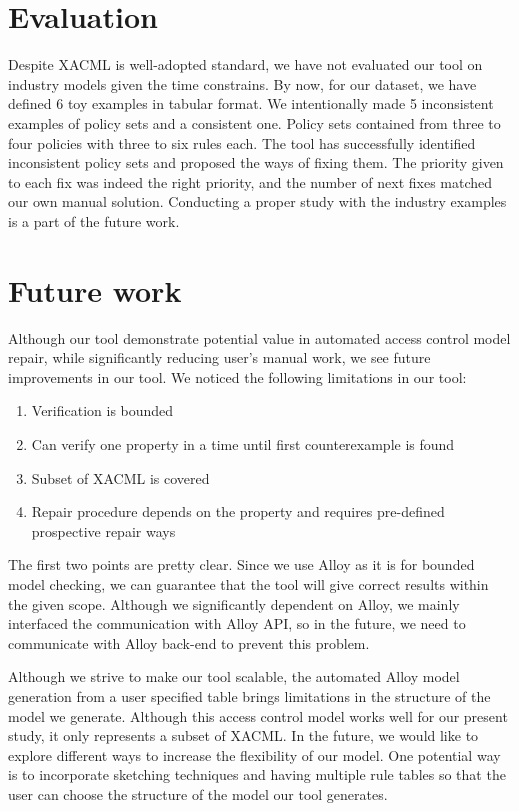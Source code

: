 \documentclass{acm_proc_article-sp}
\begin{document}
\section{Evaluation}

Despite XACML is well-adopted standard, we have not evaluated our tool on industry models given the time constrains. By now, for our dataset, we have defined 6 toy examples in tabular format. We intentionally made 5 inconsistent examples of policy sets and a consistent one. Policy sets contained from three to four policies with three to six rules each. The tool has successfully identified inconsistent policy sets and proposed the ways of fixing them. The priority given to each fix was indeed the right priority, and the number of next fixes matched our own manual solution. Conducting a proper study with the industry examples is a part of the future work.

\section{Future work}

Although our tool demonstrate potential value in automated access control model repair, while significantly reducing user's manual work, we see future improvements in our tool. We noticed the following limitations in our tool:

\begin{enumerate}
\item Verification is bounded
\item Can verify one property in a time until first counterexample is found
\item Subset of XACML is covered
\item Repair procedure depends on the property and requires pre-defined prospective repair ways
\end{enumerate}

The first two points are pretty clear. Since we use Alloy as it is for bounded model checking, we can guarantee that the tool will give correct results within the given scope. Although we significantly dependent on Alloy, we mainly interfaced the communication with Alloy API, so in the future, we need to communicate with Alloy back-end to prevent this problem.

Although we strive to make our tool scalable, the automated Alloy model generation from a user specified table brings limitations in the structure of the model we generate. Although this access control model works well for our present study, it only represents a subset of XACML. In the future, we would like to explore different ways to increase the flexibility of our model. One potential way is to incorporate sketching techniques and having multiple rule tables so that the user can choose the structure of the model our tool generates.
\end{document}

